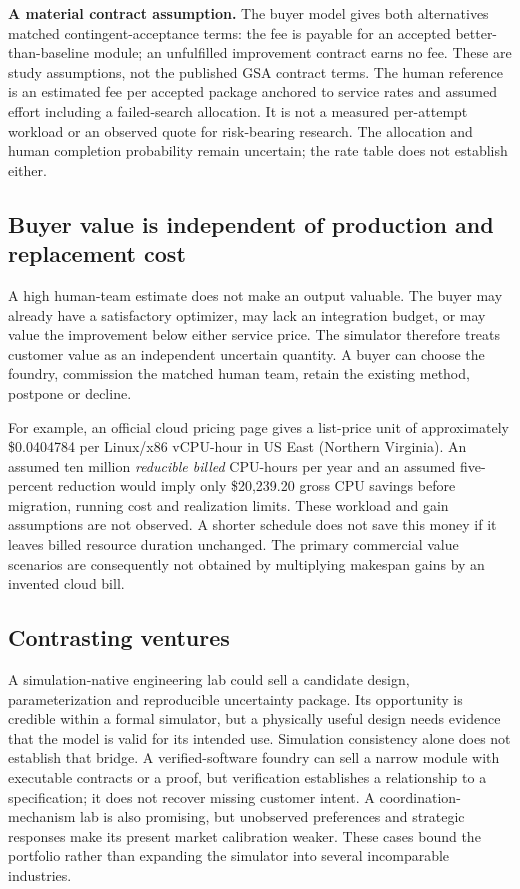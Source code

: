 \documentclass[11pt,a4paper]{article}
\newcommand{\usd}[1]{\$#1}
\begin{document}
\textbf{A material contract assumption.} The buyer model gives both alternatives matched contingent-acceptance terms: the fee is payable for an accepted better-than-baseline module; an unfulfilled improvement contract earns no fee. These are study assumptions, not the published GSA contract terms. The human reference is an estimated fee per accepted package anchored to service rates and assumed effort including a failed-search allocation. It is not a measured per-attempt workload or an observed quote for risk-bearing research. The allocation and human completion probability remain uncertain; the rate table does not establish either.

\subsection{Buyer value is independent of production and replacement cost}

A high human-team estimate does not make an output valuable. The buyer may already have a satisfactory optimizer, may lack an integration budget, or may value the improvement below either service price. The simulator therefore treats customer value as an independent uncertain quantity. A buyer can choose the foundry, commission the matched human team, retain the existing method, postpone or decline.

For example, an official cloud pricing page gives a list-price unit of approximately \usd{0.0404784} per Linux/x86 vCPU-hour in US East (Northern Virginia). An assumed ten million \emph{reducible billed} CPU-hours per year and an assumed five-percent reduction would imply only \usd{20,239.20} gross CPU savings before migration, running cost and realization limits. These workload and gain assumptions are not observed. A shorter schedule does not save this money if it leaves billed resource duration unchanged.\cite{AWS} The primary commercial value scenarios are consequently not obtained by multiplying makespan gains by an invented cloud bill.

\subsection{Contrasting ventures}

A simulation-native engineering lab could sell a candidate design, parameterization and reproducible uncertainty package. Its opportunity is credible within a formal simulator, but a physically useful design needs evidence that the model is valid for its intended use. Simulation consistency alone does not establish that bridge.\cite{NASA} A verified-software foundry can sell a narrow module with executable contracts or a proof, but verification establishes a relationship to a specification; it does not recover missing customer intent.\cite{Dafny} A coordination-mechanism lab is also promising, but unobserved preferences and strategic responses make its present market calibration weaker. These cases bound the portfolio rather than expanding the simulator into several incomparable industries.
\end{document}
